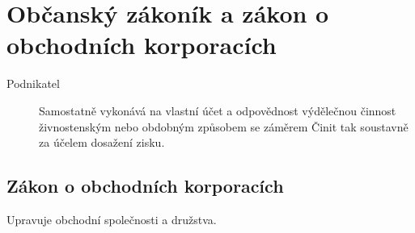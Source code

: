 \chapter{Občanský zákoník a zákon o obchodních korporacích}

\begin{description}
    \item[Podnikatel] Samostatně vykonává na vlastní účet a odpovědnost výdělečnou činnost živnostenským nebo obdobným způsobem se záměrem Činit tak soustavně za účelem dosažení zisku.
\end{description}

\section*{Zákon o obchodních korporacích}
Upravuje obchodní společnosti a družstva.
